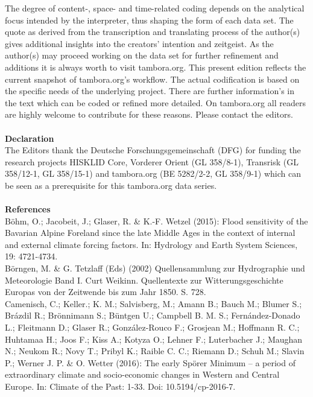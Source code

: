 The degree of content-, space- and time-related coding depends on the analytical focus intended by the interpreter, thus shaping the form of each data set. The quote as derived from the transcription and translating process of the author(s) gives additional insights into the creators’ intention and zeitgeist. As the author(s) may proceed working on the data set for further refinement and additions it is always worth to visit tambora.org. This present edition reflects the current snapshot of tambora.org’s workflow. The actual codification is based on the specific needs of the underlying project. There are further information’s in the text which can be coded or refined more detailed. On tambora.org all readers are highly welcome to contribute for these reasons. Please contact the editors.
\\\\
\textbf{Declaration}
\vspace{0.25cm}\\
The Editors thank the Deutsche Forschungsgemeinschaft (DFG) for funding the research projects HISKLID Core, Vorderer Orient (GL 358/8-1), Transrisk (GL 358/12-1, GL 358/15-1) and tambora.org (BE 5282/2-2, GL 358/9-1) which can be seen as a prerequisite for this tambora.org data series.
\\\\
\textbf{References}
\vspace{0.25cm}\\
Böhm, O.; Jacobeit, J.; Glaser, R. \& K.-F. Wetzel (2015): Flood sensitivity of the Bavarian Alpine Foreland since the late Middle Ages in the context of internal and external climate forcing factors. In: Hydrology and Earth System Sciences, 19: 4721-4734.\\
Börngen, M. \& G. Tetzlaff (Eds) (2002) Quellensammlung zur Hydrographie und Meteorologie Band I. Curt Weikinn. Quellentexte zur Witterungsgeschichte Europas von der Zeitwende bis zum Jahr 1850. S. 728.\\
Camenisch, C.; Keller.; K. M.; Salvisberg, M.; Amann B.; Bauch M.; Blumer S.; Brázdil R.; Brönnimann S.; Büntgen U.; Campbell B. M. S.; Fernández-Donado L.; Fleitmann D.; Glaser R.; González-Rouco F.; Grosjean M.; Hoffmann R. C.; Huhtamaa H.; Joos F.; Kiss A.; Kotyza O.; Lehner F.; Luterbacher J.; Maughan N.; Neukom R.; Novy T.; Pribyl K.; Raible C. C.; Riemann D.; Schuh M.; Slavin P.; Werner J. P. \& O. Wetter (2016): The early Spörer Minimum – a period of extraordinary climate and socio-economic changes in Western and Central Europe. In: Climate of the Past: 1-33. Doi: 10.5194/cp-2016-7.\\
